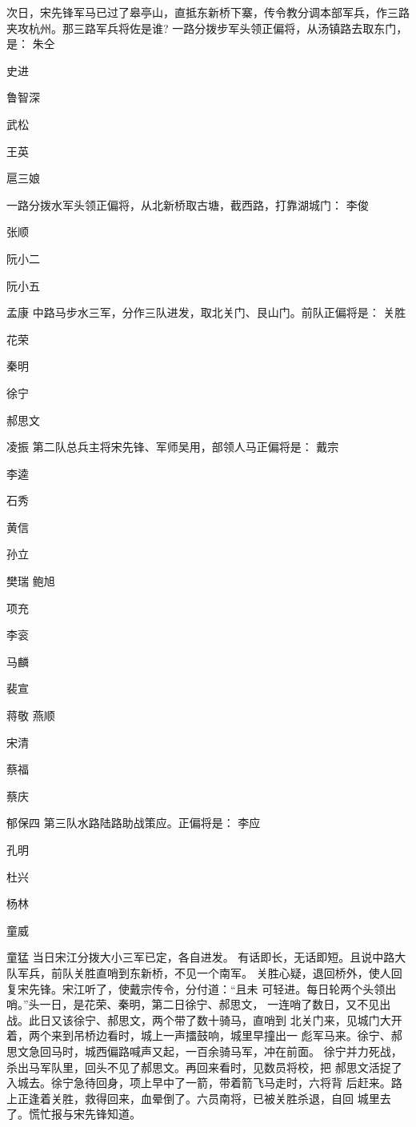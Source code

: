 次日，宋先锋军马已过了皋亭山，直抵东新桥下寨，传令教分调本部军兵，作三路
夹攻杭州。那三路军兵将佐是谁?
一路分拨步军头领正偏将，从汤镇路去取东门，是：
朱仝

史进

鲁智深

武松

王英

扈三娘

一路分拨水军头领正偏将，从北新桥取古塘，截西路，打靠湖城门：
李俊

张顺

阮小二

阮小五

孟康
中路马步水三军，分作三队进发，取北关门、艮山门。前队正偏将是：
关胜

花荣

秦明

徐宁

郝思文

凌振
第二队总兵主将宋先锋、军师吴用，部领人马正偏将是：
戴宗

李逵

石秀

黄信

孙立

樊瑞
鲍旭

项充

李衮

马麟

裴宣

蒋敬
燕顺

宋清

蔡福

蔡庆

郁保四
第三队水路陆路助战策应。正偏将是：
李应

孔明

杜兴

杨林

童威

童猛
当日宋江分拨大小三军已定，各自进发。
有话即长，无话即短。且说中路大队军兵，前队关胜直哨到东新桥，不见一个南军。
关胜心疑，退回桥外，使人回复宋先锋。宋江听了，使戴宗传令，分付道：“且未
可轻进。每日轮两个头领出哨。”头一日，是花荣、秦明，第二日徐宁、郝思文，
一连哨了数日，又不见出战。此日又该徐宁、郝思文，两个带了数十骑马，直哨到
北关门来，见城门大开着，两个来到吊桥边看时，城上一声擂鼓响，城里早撞出一
彪军马来。徐宁、郝思文急回马时，城西偏路喊声又起，一百余骑马军，冲在前面。
徐宁并力死战，杀出马军队里，回头不见了郝思文。再回来看时，见数员将校，把
郝思文活捉了入城去。徐宁急待回身，项上早中了一箭，带着箭飞马走时，六将背
后赶来。路上正逢着关胜，救得回来，血晕倒了。六员南将，已被关胜杀退，自回
城里去了。慌忙报与宋先锋知道。

